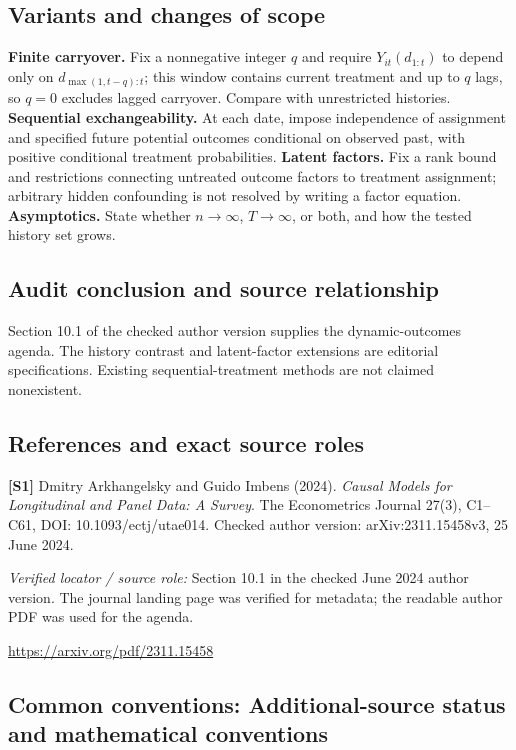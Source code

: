 \documentclass[11pt,a4paper]{article}
\begin{document}
\subsection*{Variants and changes of scope}

\textbf{Finite carryover.} Fix a nonnegative integer $q$ and require $Y_{it}(d_{1:t})$ to depend only on $d_{\max(1,t-q):t}$; this window contains current treatment and up to $q$ lags, so $q=0$ excludes lagged carryover. Compare with unrestricted histories. \textbf{Sequential exchangeability.} At each date, impose independence of assignment and specified future potential outcomes conditional on observed past, with positive conditional treatment probabilities. \textbf{Latent factors.} Fix a rank bound and restrictions connecting untreated outcome factors to treatment assignment; arbitrary hidden confounding is not resolved by writing a factor equation. \textbf{Asymptotics.} State whether $n\to\infty$, $T\to\infty$, or both, and how the tested history set grows.

\subsection*{Audit conclusion and source relationship}

Section 10.1 of the checked author version supplies the dynamic-outcomes agenda. The history contrast and latent-factor extensions are editorial specifications. Existing sequential-treatment methods are not claimed nonexistent.

\subsection*{References and exact source roles}

{\footnotesize\raggedright
\par\noindent\textbf{[S1]} Dmitry Arkhangelsky and Guido Imbens (2024). \emph{Causal Models for Longitudinal and Panel Data: A Survey}. The Econometrics Journal 27(3), C1--C61, DOI: 10.1093/ectj/utae014. Checked author version: arXiv:2311.15458v3, 25 June 2024.\par \textit{Verified locator / source role:} Section 10.1 in the checked June 2024 author version. The journal landing page was verified for metadata; the readable author PDF was used for the agenda.\par \url{https://arxiv.org/pdf/2311.15458}\par\smallskip
}

\subsection*{Common conventions: Additional-source status and mathematical conventions}
\end{document}
